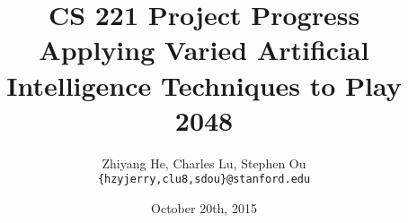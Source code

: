 \documentclass[11pt]{article}
\title{CS 221 Project Progress \\ Applying Varied Artificial Intelligence Techniques to Play 2048}
\author{Zhiyang He, Charles Lu, Stephen Ou \\ \texttt{\{hzyjerry,clu8,sdou\}@stanford.edu}}
\date{October 20th, 2015}
\begin{document}
\maketitle

\begin{thebibliography}{9}

\end{thebibliography}
\end{document}
